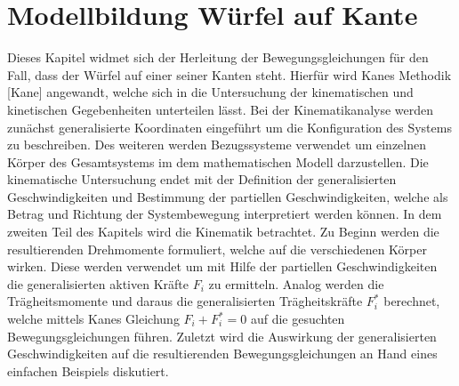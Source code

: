 \ifx\FORMAT\undefined


\fi

\chapter{Modellbildung Würfel auf Kante}
Dieses Kapitel widmet sich der Herleitung der Bewegungsgleichungen für den Fall, dass der Würfel auf einer seiner Kanten steht. Hierfür wird Kanes Methodik [Kane] angewandt, welche sich in die Untersuchung der kinematischen und kinetischen Gegebenheiten unterteilen lässt. Bei der Kinematikanalyse werden zunächst generalisierte Koordinaten eingeführt um die Konfiguration des Systems zu beschreiben. Des weiteren werden Bezugssysteme verwendet um einzelnen Körper des Gesamtsystems im dem mathematischen Modell darzustellen. Die kinematische Untersuchung endet mit der Definition der generalisierten Geschwindigkeiten und Bestimmung der partiellen Geschwindigkeiten, welche als Betrag und Richtung der Systembewegung interpretiert werden können.
In dem zweiten Teil des Kapitels wird die Kinematik betrachtet. Zu Beginn werden die resultierenden Drehmomente formuliert, welche auf die verschiedenen Körper wirken. Diese werden verwendet um mit Hilfe der partiellen Geschwindigkeiten die generalisierten aktiven Kräfte $F_i$ zu ermitteln. Analog werden die Trägheitsmomente und daraus die generalisierten Trägheitskräfte $F^*_i$ berechnet, welche mittels Kanes Gleichung $F_i+F^*_i=0$ auf die gesuchten Bewegungsgleichungen führen. Zuletzt wird die Auswirkung der generalisierten Geschwindigkeiten auf die resultierenden Bewegungsgleichungen an Hand eines einfachen Beispiels diskutiert.
\newpage

\newpage


\ifx\FORMAT\undefined

\fi